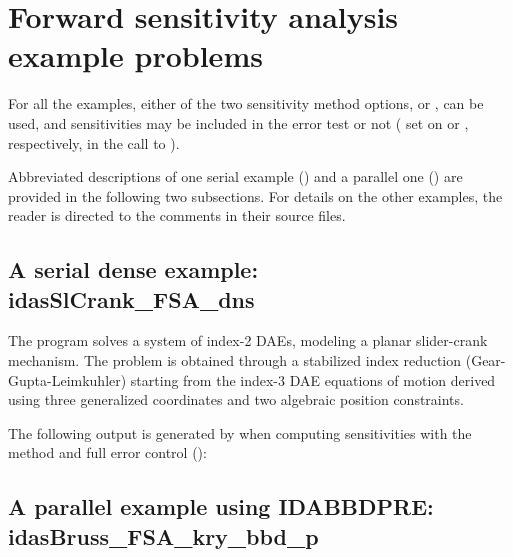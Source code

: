 \section{Forward sensitivity analysis example problems}\label{s:fwd_ex}

For all the {\idas} examples, either of the two sensitivity method options,
 or , can be used, 
and sensitivities may be included in the error test or not 
( set on  or , respectively, in the
call to ).

Abbreviated descriptions of one serial example ()
and a parallel one () are provided in the following
two subsections.  For details on the other examples, the reader is
directed to the comments in their source files.

\subsection{A serial dense example: idasSlCrank\_FSA\_dns}
\label{ss:idasSlCrank_FSA_dns}

The  program solves a system of index-2 DAEs, modeling a
planar slider-crank mechanism.  The problem is obtained through a stabilized index
reduction (Gear-Gupta-Leimkuhler) starting from the index-3 DAE equations of motion
derived using three generalized coordinates and two algebraic position constraints.

The following output is generated by  when computing
sensitivities with the  method and full error
control ():



\newpage
\subsection{A parallel example using IDABBDPRE: idasBruss\_FSA\_kry\_bbd\_p}
\label{ss:idasBruss_FSA_kry_bbd_p}

